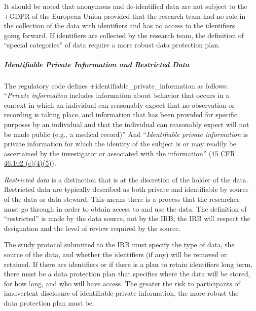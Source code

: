 \documentclass[
]{WileySix}
\begin{document}
\begin{bbox}
\begin{bbox}

It should be noted that anonymous and de-identified data are not subject to the +GDPR\textbar{} of the European Union provided that the research team had no role in the collection of the data with identifiers and has no access to the identifiers going forward. If identifiers are collected by the research team, the definition of ``special categories'' of data require a more robust data protection plan.

\end{bbox}
\end{bbox}

\hypertarget{identifiable-private-information-and-restricted-data}{%
\subparagraph{Identifiable Private Information and Restricted Data}\label{identifiable-private-information-and-restricted-data}}

The regulatory code defines +identifiable\_private\_information\textbar{} as follows: ``\emph{Private information} includes information about behavior that occurs in a context in which an individual can reasonably expect that no observation or recording is taking place, and information that has been provided for specific purposes by an individual and that the individual can reasonably expect will not be made public (e.g., a medical record)'' And ``\emph{Identifiable private information} is private information for which the identity of the subject is or may readily be ascertained by the investigator or associated with the information'' (\href{https://www.law.cornell.edu/cfr/text/45/46.102}{45 CFR 46.102 (e)(4)(5)}).

\emph{Restricted data} is a distinction that is at the discretion of the holder of the data. Restricted data are typically described as both private and identifiable by source of the data or data steward. This means there is a process that the researcher must go through in order to obtain access to and use the data. The definition of ``restricted'' is made by the data source, not by the IRB; the IRB will respect the designation and the level of review required by the source.

The study protocol submitted to the IRB must specify the type of data, the source of the data, and whether the identifiers (if any) will be removed or retained. If there are identifiers or if there is a plan to retain identifiers long term, there must be a data protection plan that specifies where the data will be stored, for how long, and who will have access. The greater the risk to participants of inadvertent disclosure of identifiable private information, the more robust the data protection plan must be.
\end{document}
